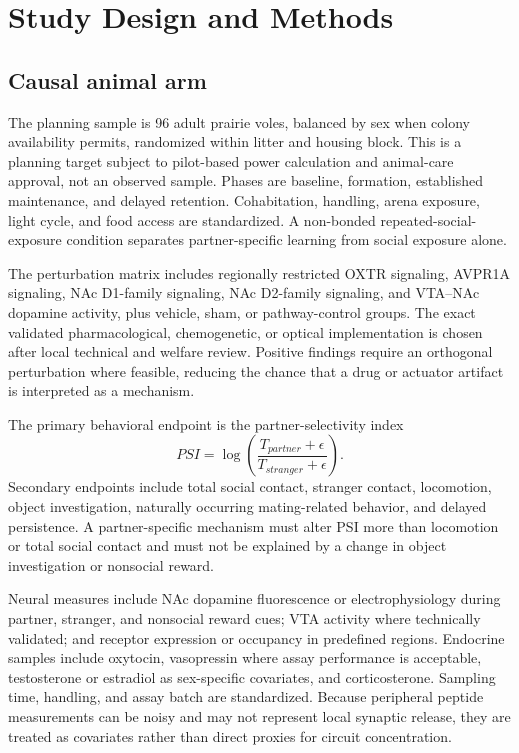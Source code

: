 \documentclass[conference]{IEEEtran}
\begin{document}
\section{Study Design and Methods}
\subsection{Causal animal arm}
The planning sample is 96 adult prairie voles, balanced by sex when colony availability permits, randomized within litter and housing block. This is a planning target subject to pilot-based power calculation and animal-care approval, not an observed sample. Phases are baseline, formation, established maintenance, and delayed retention. Cohabitation, handling, arena exposure, light cycle, and food access are standardized. A non-bonded repeated-social-exposure condition separates partner-specific learning from social exposure alone.

The perturbation matrix includes regionally restricted OXTR signaling, AVPR1A signaling, NAc D1-family signaling, NAc D2-family signaling, and VTA--NAc dopamine activity, plus vehicle, sham, or pathway-control groups. The exact validated pharmacological, chemogenetic, or optical implementation is chosen after local technical and welfare review. Positive findings require an orthogonal perturbation where feasible, reducing the chance that a drug or actuator artifact is interpreted as a mechanism.

The primary behavioral endpoint is the partner-selectivity index
\begin{equation}
PSI=\log\left(\frac{T_{partner}+\epsilon}{T_{stranger}+\epsilon}\right).
\end{equation}
Secondary endpoints include total social contact, stranger contact, locomotion, object investigation, naturally occurring mating-related behavior, and delayed persistence. A partner-specific mechanism must alter PSI more than locomotion or total social contact and must not be explained by a change in object investigation or nonsocial reward.

Neural measures include NAc dopamine fluorescence or electrophysiology during partner, stranger, and nonsocial reward cues; VTA activity where technically validated; and receptor expression or occupancy in predefined regions. Endocrine samples include oxytocin, vasopressin where assay performance is acceptable, testosterone or estradiol as sex-specific covariates, and corticosterone. Sampling time, handling, and assay batch are standardized. Because peripheral peptide measurements can be noisy and may not represent local synaptic release, they are treated as covariates rather than direct proxies for circuit concentration.
\end{document}
